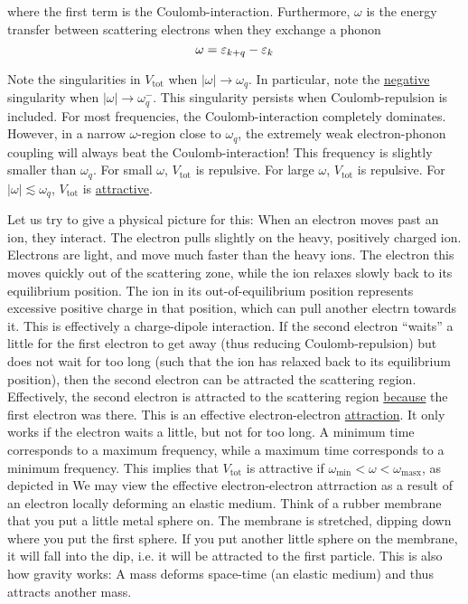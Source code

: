 where the first term is the Coulomb-interaction. 
Furthermore, $\omega$ is the energy transfer between scattering electrons when they exchange a phonon
\begin{equation}
\omega = \varepsilon_{k+q} - \varepsilon_k
\end{equation}


Note the singularities in $V_{\text{tot}}$ when $|\omega|\rightarrow\omega_q$. In particular, note the \underline{negative} singularity when $|\omega|\rightarrow\omega_q^-$. This singularity persists when Coulomb-repulsion is included. For most frequencies, the Coulomb-interaction completely dominates. However, in a narrow $\omega$-region close to $\omega_q$, the extremely weak electron-phonon coupling will always beat the Coulomb-interaction! This frequency is slightly smaller than $\omega_q$. For small $\omega$, $V_{\text{tot}}$ is repulsive. For large $\omega$, $V_{\text{tot}}$ is repulsive. For $|\omega| \lesssim \omega_q$, $V_{\text{tot}}$ is \underline{attractive}.

Let us try to give a physical picture for this: When an electron moves past an ion, they interact. The electron pulls slightly on the heavy, positively charged ion. Electrons are light, and move much faster than the heavy ions. The electron this moves quickly out of the scattering zone, while the ion relaxes slowly back to its equilibrium position. The ion in its out-of-equilibrium position represents excessive positive charge in that position, which can pull another electrn towards it. This is effectively a charge-dipole interaction. If the second electron ``waits'' a little for the first electron to get away (thus reducing Coulomb-repulsion) but does not wait for too long (such that the ion has relaxed back to its equilibrium position), then the second electron can be attracted the scattering region. Effectively, the second electron is attracted to the scattering region \underline{because} the first electron was there. This is an effective electron-electron \underline{attraction}. It only works if the electron waits a little, but not for too long. 
A minimum time corresponds to a maximum frequency, while a maximum time corresponds to a minimum frequency. This implies that $V_{\text{tot}}$ is attractive if $\omega_\text{min} <\omega<\omega_\text{masx}$, as depicted in 
We may view the effective electron-electron attrraction as a result of an electron locally deforming an elastic medium. Think of a rubber membrane that you put a little metal sphere on. The membrane is stretched, dipping down where you put the first sphere. If you put another little sphere on the membrane, it will fall into the dip, i.e. it will be attracted to the first particle.
This is also how gravity works: A mass deforms space-time (an elastic medium) and thus attracts another mass. 

